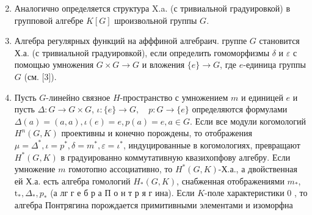 \documentclass[10pt]{article}
\begin{document}
\begin{enumerate}

  \setcounter{enumi}{1}

  \item Аналогично определяется структура X.a. (с тривиальной градуировкой) в групповой алгебре $K[G]$ шроизвольной группы $G$.



  \item Алгебра регулярных функций на афффиной алгебраич. группе $G$ становится Х.а. (с тривиальной градуировкой), если определить гомоморфизмы $\delta$ и $\varepsilon$ с помощью умножения $G \times G \longrightarrow G$ и вложения $\{e\} \longrightarrow G$, где $e$-единица группы $G$ (см. [3]).



  \item Пусть $G$-линейно связное $H$-пространство с умножением $m$ и единицей $e$ и пусть $\Delta: G \longrightarrow G \times G$, $\iota:\{e\} \longrightarrow G, \quad p: G \longrightarrow\{e\}$ определяются формулами $\Delta(a)=(a, a), \iota(e)=e, p(a)=e, a \in G$. Если все модули когомологий $H^{n}(G, K)$ проективны и конечно порождены, то отображения $\mu=\Delta^{*}, \iota=p^{*}, \delta=m^{*}, \varepsilon=\iota^{*}$, индуцированные в когомологиях, превращают $H^{*}(G, K)$ в градуированно коммутативную квазихопфову алгебру. Если умножение $m$ гомотопно ассоциативно, то $H^{*}(G, K)$-Х.а., а двойственная ей Х.а. есть алгебра гомологий $H_{*}(G, K)$, снабженная отображениями $m_{*}$, $\mathrm{t}_{*}, \Delta_{*}, p_{*}$ (а лг г е б р а П о н т р я г ина). Если $K$-поле характеристики 0 , то алгебра Понтрягина порождается примитивными элементами и изоморфна



\end{enumerate}
\end{document}
